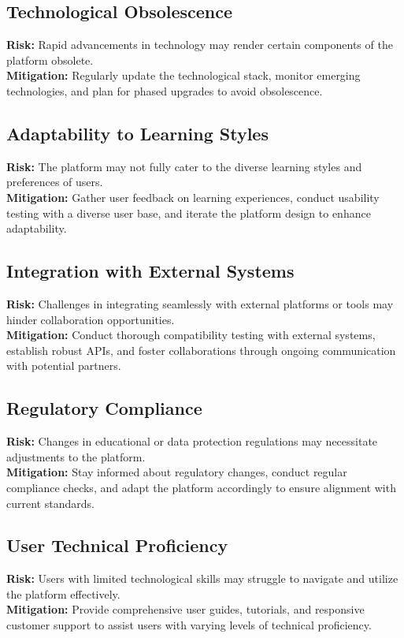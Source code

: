 \subsection{Technological Obsolescence}
\textbf{Risk:} Rapid advancements in technology may render certain components of the platform obsolete. \\
\textbf{Mitigation:} Regularly update the technological stack, monitor emerging technologies, and plan for phased upgrades to avoid obsolescence.

\subsection{Adaptability to Learning Styles}
\textbf{Risk:} The platform may not fully cater to the diverse learning styles and preferences of users. \\
\textbf{Mitigation:} Gather user feedback on learning experiences, conduct usability testing with a diverse user base, and iterate the platform design to enhance adaptability.

\subsection{Integration with External Systems}
\textbf{Risk:} Challenges in integrating seamlessly with external platforms or tools may hinder collaboration opportunities. \\
\textbf{Mitigation:} Conduct thorough compatibility testing with external systems, establish robust APIs, and foster collaborations through ongoing communication with potential partners.

\newpage 

\subsection{Regulatory Compliance}
\textbf{Risk:} Changes in educational or data protection regulations may necessitate adjustments to the platform. \\
\textbf{Mitigation:} Stay informed about regulatory changes, conduct regular compliance checks, and adapt the platform accordingly to ensure alignment with current standards.

\subsection{User Technical Proficiency}
\textbf{Risk:} Users with limited technological skills may struggle to navigate and utilize the platform effectively. \\
\textbf{Mitigation:} Provide comprehensive user guides, tutorials, and responsive customer support to assist users with varying levels of technical proficiency.


